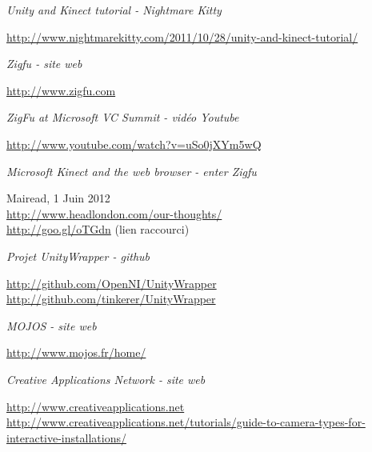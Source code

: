 \begin{thebibliography}{200}
\begin{footnotesize}
  \emph{Unity and Kinect tutorial - Nightmare Kitty}\\
  \begin{tiny}
  \url{http://www.nightmarekitty.com/2011/10/28/unity-and-kinect-tutorial/}
  \end{tiny}

  \emph{Zigfu - site web}\\
  \begin{tiny}
  \url{http://www.zigfu.com}
  \end{tiny}

  \emph{ZigFu at Microsoft VC Summit - vidéo Youtube}\\
  \begin{tiny}
  \url{http://www.youtube.com/watch?v=uSo0jXYm5wQ}
  \end{tiny}
  
  \emph{Microsoft Kinect and the web browser - enter Zigfu}\\
  \begin{tiny}
  Mairead, 1 Juin 2012\\
  \url{http://www.headlondon.com/our-thoughts/}\\
  \url{http://goo.gl/oTGdn} (lien raccourci)
  \end{tiny}
  
  \emph{Projet UnityWrapper - github}\\
  \begin{tiny}
  \url{http://github.com/OpenNI/UnityWrapper}\\
  \url{http://github.com/tinkerer/UnityWrapper}
  \end{tiny}
  
  \emph{MOJOS - site web}\\
  \begin{tiny}
  \url{http://www.mojos.fr/home/}
  \end{tiny}

  \emph{Creative Applications Network - site web}\\
  \begin{tiny}
  \url{http://www.creativeapplications.net}
  \url{http://www.creativeapplications.net/tutorials/guide-to-camera-types-for-interactive-installations/}
  \end{tiny}
  
\end{footnotesize}
\end{thebibliography}
